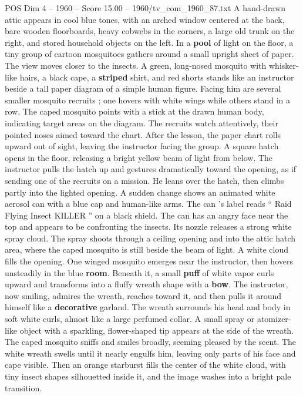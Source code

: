 \begin{textsample}{POS Dim 4 – 1960 – Score 15.00 – 1960/tv\_com\_1960\_87.txt}  \label{ex:f4_pos_066}
A hand-drawn attic appears in cool blue tones, with an arched window centered at the back, bare wooden floorboards, heavy cobwebs in the corners, a large old trunk on the right, and stored household objects on the left.
In a \textbf{pool} of light on the floor, a tiny group of cartoon mosquitoes gathers around a small upright sheet of paper.
The view moves closer to the insects.
A green, long-nosed mosquito with whisker-like hairs, a black cape, a \textbf{striped} shirt, and red shorts stands like an instructor beside a tall paper diagram of a simple human figure.
Facing him are several smaller mosquito recruits ; one hovers with white wings while others stand in a row.
The caped mosquito points with a stick at the drawn human body, indicating target areas on the diagram.
The recruits watch attentively, their pointed noses aimed toward the chart.
After the lesson, the paper chart rolls upward out of sight, leaving the instructor facing the group.
A square hatch opens in the floor, releasing a bright yellow beam of light from below.
The instructor pulls the hatch up and gestures dramatically toward the opening, as if sending one of the recruits on a mission.
He leans over the hatch, then climbs partly into the lighted opening.
A sudden change shows an animated white aerosol can with a blue cap and human-like arms.
The can ’s label reads “ Raid Flying Insect KILLER ” on a black shield.
The can has an angry face near the top and appears to be confronting the insects.
Its nozzle releases a strong white spray cloud.
The spray shoots through a ceiling opening and into the attic hatch area, where the caped mosquito is still beside the beam of light.
A white cloud fills the opening.
One winged mosquito emerges near the instructor, then hovers unsteadily in the blue \textbf{room}.
Beneath it, a small \textbf{puff} of white vapor curls upward and transforms into a fluffy wreath shape with a \textbf{bow}.
The instructor, now smiling, admires the wreath, reaches toward it, and then pulls it around himself like a \textbf{decorative} garland.
The wreath surrounds his head and body in soft white curls, almost like a large perfumed collar.
A small spray or atomizer-like object with a sparkling, flower-shaped tip appears at the side of the wreath.
The caped mosquito sniffs and smiles broadly, seeming pleased by the scent.
The white wreath swells until it nearly engulfs him, leaving only parts of his face and cape visible.
Then an orange starburst fills the center of the white cloud, with tiny insect shapes silhouetted inside it, and the image washes into a bright pale transition.

\end{textsample}
